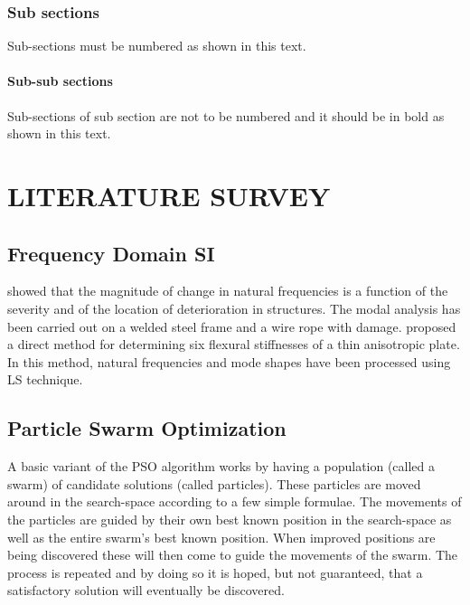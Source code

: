 \documentclass[BTech]{srmuthesis}
\begin{document}
\subsection{Sub sections} 
Sub-sections must be numbered as shown in this text. 
\subsubsection{Sub-sub sections}
Sub-sections of sub section are not to be numbered and it should be in bold as shown in this text. 
\chapter{LITERATURE SURVEY}
\section{Frequency Domain SI}
\citet{george} showed that the magnitude of change in natural frequencies is a function of the severity and of the location of deterioration in structures. The modal analysis has been carried out on a welded steel frame and a wire rope with damage. \citet{gredia} proposed a direct method for determining six flexural stiffnesses of a thin anisotropic plate. In this method, natural frequencies \citep{Leo} and mode shapes have been processed using \ac{LS} technique.
\section{Particle Swarm Optimization}
A basic variant of the \ac{PSO} \citep{kenndy} algorithm works by having a population (called a swarm) of candidate solutions (called particles). These particles are moved around in the search-space according to a few simple formulae. The movements of the particles are guided by their own best known position in the search-space as well as the entire swarm's best known position. When improved positions are being discovered these will then come to guide the movements of the swarm. The process is repeated and by doing so it is hoped, but not guaranteed, that a satisfactory solution will eventually be discovered.
\end{document}
